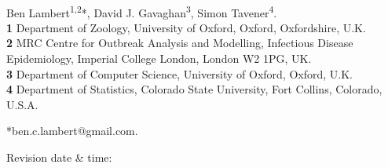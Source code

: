 \documentclass[10pt,letterpaper]{article}
\begin{document}
\vspace*{0.2in}

\begin{flushleft}
{\Large
\textbf{}
}
\newline
\\
Ben Lambert\textsuperscript{1,2}*,
David J. Gavaghan\textsuperscript{3},
Simon Tavener\textsuperscript{4}.
\\
\bigskip
\textbf{1} Department of Zoology, University of Oxford, Oxford, Oxfordshire, U.K.
\\
\textbf{2} MRC Centre for Outbreak Analysis and Modelling, Infectious Disease Epidemiology, Imperial College London, London W2 1PG, UK.
\\
\textbf{3} Department of Computer Science, University of Oxford, Oxford, U.K.
\\
\textbf{4} Department of Statistics, Colorado State University, Fort Collins, Colorado, U.S.A.
\\
\bigskip

*ben.c.lambert@gmail.com.

\end{flushleft}

\hfill Revision date \& time: \timestamp
\bigskip



\end{document}
